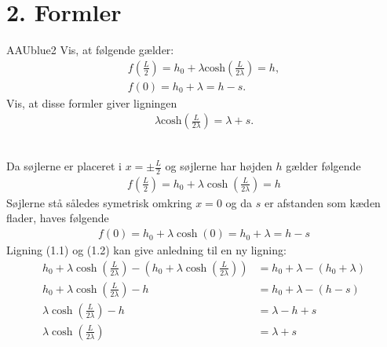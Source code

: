 \section*{2. Formler}
% 
\begin{color}{AAUblue2}
%
Vis, at følgende gælder:
\begin{align*}
f \left( \frac{L}{2} \right) = h_0 + \lambda \text{cosh} \left( \frac{L}{2 \lambda} \right) = h, \\
f(0) = h_0 + \lambda = h - s.
\end{align*}
Vis, at disse formler giver ligningen 
\begin{align*}
\lambda \text{cosh} \left( \frac{L}{2 \lambda} \right) = \lambda + s.
\end{align*}
%
\end{color}
\\
% 
%
Da søjlerne er placeret i $x = \pm \frac{L}{2}$ og søjlerne har højden $h$ gælder følgende
\begin{align}
f\left(\frac{L}{2}\right)	= h_0 + \lambda \cosh \left(\frac{L}{2 \lambda}\right) = h
\end{align}
Søjlerne stå således symetrisk omkring $x = 0$ og da $s$ er afstanden som kæden flader, haves følgende
\begin{align}
f(0) =	 h_0 + \lambda 	\cosh (0)	= h_0 + \lambda = h-s
\end{align}
%
Ligning (1.1) og (1.2) kan give anledning til en ny ligning:
%
\begin{align}
h_0 + \lambda \cosh \left(\frac{L}{2 \lambda}\right) -\left(h_0 + \lambda \cosh \left(\frac{L}{2 \lambda}\right)\right) &= h_0 + \lambda -(h_0 + \lambda)\\
h_0 + \lambda \cosh \left(\frac{L}{2 \lambda}\right) - h &= h_0 + \lambda - (h - s)\\
\lambda \cosh \left(\frac{L}{2 \lambda}\right) - h &= \lambda - h + s\\
\lambda \cosh \left(\frac{L}{2 \lambda}\right) &= \lambda + s
\end{align}